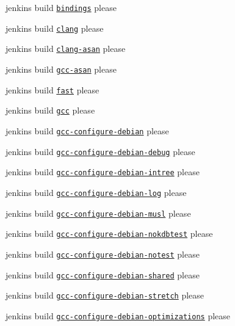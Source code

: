 \begin{DoxyItemize}
\item jenkins build \href{https://build.libelektra.org/job/elektra-test-bindings/}{\tt bindings} please
\item jenkins build \href{https://build.libelektra.org/job/elektra-clang/}{\tt clang} please
\item jenkins build \href{https://build.libelektra.org/job/elektra-clang-asan/}{\tt clang-\/asan} please
\item jenkins build \href{https://build.libelektra.org/job/elektra-gcc-asan/}{\tt gcc-\/asan} please
\item jenkins build \href{https://build.libelektra.org/job/elektra-mergerequests-fast/}{\tt fast} please
\item jenkins build \href{https://build.libelektra.org/job/elektra-gcc/}{\tt gcc} please
\item jenkins build \href{https://build.libelektra.org/job/elektra-gcc-configure-debian/}{\tt gcc-\/configure-\/debian} please
\item jenkins build \href{https://build.libelektra.org/job/elektra-gcc-configure-debian-debug}{\tt gcc-\/configure-\/debian-\/debug} please
\item jenkins build \href{https://build.libelektra.org/job/elektra-gcc-configure-debian-intree/}{\tt gcc-\/configure-\/debian-\/intree} please
\item jenkins build \href{https://build.libelektra.org/job/elektra-gcc-configure-debian-log}{\tt gcc-\/configure-\/debian-\/log} please
\item jenkins build \href{https://build.libelektra.org/job/elektra-gcc-configure-debian-musl/}{\tt gcc-\/configure-\/debian-\/musl} please
\item jenkins build \href{https://build.libelektra.org/job/elektra-gcc-configure-debian-nokdbtest/}{\tt gcc-\/configure-\/debian-\/nokdbtest} please
\item jenkins build \href{https://build.libelektra.org/job/elektra-gcc-configure-debian-notest/}{\tt gcc-\/configure-\/debian-\/notest} please
\item jenkins build \href{https://build.libelektra.org/job/elektra-gcc-configure-debian-shared/}{\tt gcc-\/configure-\/debian-\/shared} please
\item jenkins build \href{https://build.libelektra.org/job/elektra-gcc-configure-debian-stretch/}{\tt gcc-\/configure-\/debian-\/stretch} please
\item jenkins build \href{https://build.libelektra.org/job/elektra-gcc-configure-debian-optimizations/}{\tt gcc-\/configure-\/debian-\/optimizations} please

\end{DoxyItemize}
